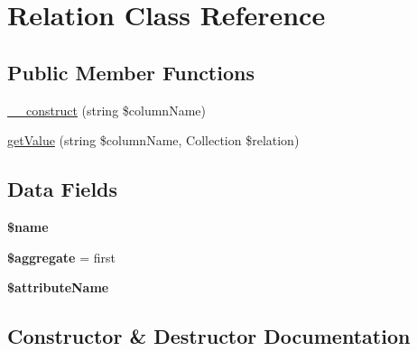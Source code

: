 \hypertarget{classhamburgscleanest_1_1_data_tables_1_1_models_1_1_relation}{}\section{Relation Class Reference}
\label{classhamburgscleanest_1_1_data_tables_1_1_models_1_1_relation}
\subsection*{Public Member Functions}
\begin{DoxyCompactItemize}
\item 
\hyperlink{classhamburgscleanest_1_1_data_tables_1_1_models_1_1_relation_a32982fa61bdbcb31c04986b55a015422}{\+\_\+\+\_\+construct} (string \$column\+Name)
\item 
\hyperlink{classhamburgscleanest_1_1_data_tables_1_1_models_1_1_relation_a2706c7287269d1fe90002ec71b629c80}{get\+Value} (string \$column\+Name, Collection \$relation)
\end{DoxyCompactItemize}
\subsection*{Data Fields}
\begin{DoxyCompactItemize}
\item 
\mbox{\label{classhamburgscleanest_1_1_data_tables_1_1_models_1_1_relation_ab2fc40d43824ea3e1ce5d86dee0d763b}} 
{\bfseries \$name}
\item 
\mbox{\label{classhamburgscleanest_1_1_data_tables_1_1_models_1_1_relation_a64886274e81c8152b822038ab683dbe1}} 
{\bfseries \$aggregate} = \textquotesingle{}first\textquotesingle{}
\item 
\mbox{\label{classhamburgscleanest_1_1_data_tables_1_1_models_1_1_relation_a257bb27c360747a7f80b842e7109f54c}} 
{\bfseries \$attribute\+Name}
\end{DoxyCompactItemize}


\subsection{Constructor \& Destructor Documentation}
\mbox{\label{classhamburgscleanest_1_1_data_tables_1_1_models_1_1_relation_a32982fa61bdbcb31c04986b55a015422}} 
